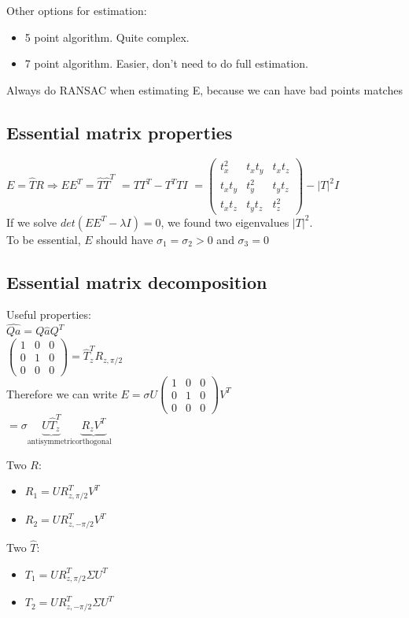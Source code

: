 Other options for estimation:
\begin{itemize}
  \item 5 point algorithm. Quite complex.
  \item 7 point algorithm. Easier, don't need to do full estimation.
\end{itemize}

\alert{Always do RANSAC when estimating E, because we can have bad
points matches}

\subsection*{Essential matrix properties}
$E = \hat{T} R \Rightarrow E E^T = \hat{T} \hat{T}^T$ 
$=T T^T - T^T T I$
$=\begin{pmatrix} 
  t_x^2 & t_x t_y & t_x t_z \\
  t_x t_y & t_y^2 & t_y t_z \\
  t_x t_z & t_y t_z & t_z^2
\end{pmatrix} - |T|^2 I$\\
If we solve $det(E E^T - \lambda I) = 0$, we found two eigenvalues
$|T|^2$.\\
To be essential, $E$ should have $\sigma_1 = \sigma_2 > 0$ and $\sigma_3
= 0$

\subsection*{Essential matrix decomposition}
Useful properties: \\
$\hat{Q a} = Q \hat{a} Q^T$\\
$\begin{pmatrix}
  1 & 0 & 0 \\ 0 & 1 & 0 \\ 0& 0& 0
\end{pmatrix} =\hat{T}^T_z R_{z, \pi/2}$ \\
Therefore we can write
$E = \sigma U
\begin{pmatrix}
  1 & 0 & 0 \\ 0 & 1 & 0 \\ 0& 0& 0
\end{pmatrix} V^T$\\
$=\sigma \underbrace{U \hat{T}^T_z}_{\text{antisymmetric}}
\underbrace{R_z V^T}_{\text{orthogonal}}$

Two $R$:
\begin{itemize}
  \item $R_1 = U R^T_{z, \pi/2} V^T$
  \item $R_2 = U R^T_{z, -\pi/2} V^T$
\end{itemize}
Two $\hat{T}$:
\begin{itemize}
  \item $T_1 = U R^T_{z, \pi/2} \Sigma U^T$
  \item $T_2 = U R^T_{z, -\pi/2} \Sigma U^T$
\end{itemize}

